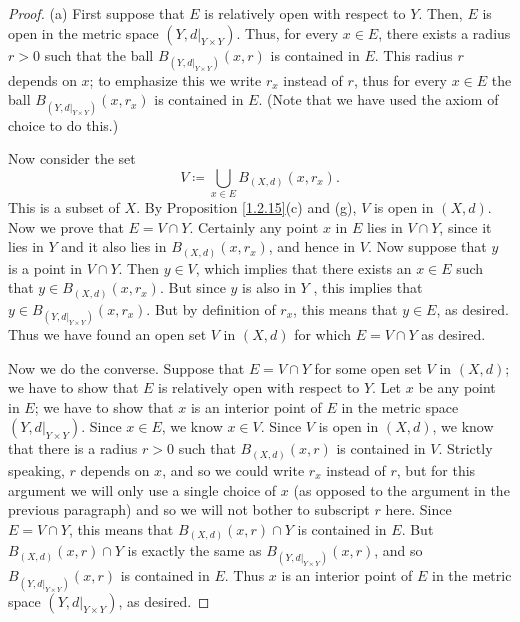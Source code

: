 \begin{proof}{(a)}
    First suppose that \(E\) is relatively open with respect to \(Y\).
    Then, \(E\) is open in the metric space \((Y, d|_{Y \times Y})\).
    Thus, for every \(x \in E\), there exists a radius \(r > 0\) such that the ball \(B_{(Y, d|_{Y \times Y})}(x, r)\) is contained in \(E\).
    This radius \(r\) depends on \(x\);
    to emphasize this we write \(r_x\) instead of \(r\), thus for every \(x \in E\) the ball \(B_{(Y, d|_{Y \times Y})}(x, r_x)\) is contained in \(E\).
    (Note that we have used the axiom of choice to do this.)

    Now consider the set
    \[
        V \coloneqq \bigcup_{x \in E} B_{(X, d)}(x, r_x).
    \]
    This is a subset of \(X\).
    By Proposition \ref{1.2.15}(c) and (g), \(V\) is open in \((X, d)\).
    Now we prove that \(E = V \cap Y\).
    Certainly any point \(x\) in \(E\) lies in \(V \cap Y\), since it lies in \(Y\) and it also lies in \(B_{(X, d)}(x, r_x)\), and hence in \(V\).
    Now suppose that \(y\) is a point in \(V \cap Y\).
    Then \(y \in V\), which implies that there exists an \(x \in E\) such that \(y \in B_{(X, d)}(x, r_x)\).
    But since \(y\) is also in \(Y\) , this implies that \(y \in B_{(Y, d|_{Y \times Y})}(x, r_x)\).
    But by definition of \(r_x\), this means that \(y \in E\), as desired.
    Thus we have found an open set \(V\) in \((X, d)\) for which \(E = V \cap Y\) as desired.

    Now we do the converse.
    Suppose that \(E = V \cap Y\) for some open set \(V\) in \((X, d)\);
    we have to show that \(E\) is relatively open with respect to \(Y\).
    Let \(x\) be any point in \(E\);
    we have to show that \(x\) is an interior point of \(E\) in the metric space \((Y, d|_{Y \times Y})\).
    Since \(x \in E\), we know \(x \in V\).
    Since \(V\) is open in \((X, d)\), we know that there is a radius \(r > 0\) such that \(B_{(X, d)}(x, r)\) is contained in \(V\).
    Strictly speaking, \(r\) depends on \(x\), and so we could write \(r_x\) instead of \(r\), but for this argument we will only use a single choice of \(x\) (as opposed to the argument in the previous paragraph) and so we will not bother to subscript \(r\) here.
    Since \(E = V \cap Y\), this means that \(B_{(X, d)}(x, r) \cap Y\) is contained in \(E\).
    But \(B_{(X, d)}(x, r) \cap Y\) is exactly the same as \(B_{(Y, d|_{Y \times Y})}(x, r)\), and so \(B_{(Y, d|_{Y \times Y})}(x, r)\) is contained in \(E\).
    Thus \(x\) is an interior point of \(E\) in the metric space \((Y, d|_{Y \times Y})\), as desired.
\end{proof}

